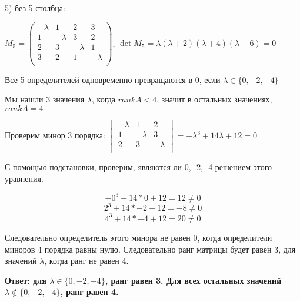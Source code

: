 \documentclass[a4paper,12pt]{article}
\begin{document}
\begin{enumerate}
5) без 5 столбца:

$M_5= \begin{pmatrix}
{-\lambda}&{1}&{2}&{3}\\
{1}&{-\lambda}&{3}&{2}\\
{2}&{3}&{-\lambda}&{1}\\
{3}&{2}&{1}&{-\lambda}\\
\end{pmatrix}$, $\det M_5 = \lambda(\lambda+2)(\lambda+4)(\lambda-6)=0$

Все 5 определителей одновременно превращаются в 0, если $\lambda \in \{ 0,-2,-4\} $

Мы нашли 3 значения $\lambda$, когда $rank A < 4$, значит в остальных значениях, $rank A = 4$

Проверим минор 3 порядка:
$\begin{vmatrix}
{-\lambda}&{1}&{2}\\
{1}&{-\lambda}&{3}\\
{2}&{3}&{-\lambda}\\
\end{vmatrix}=-\lambda^3+14\lambda+12=0$

С помощью подстановки, проверим, являются ли 0, -2, -4 решением этого уравнения.

$$-0^3+14*0+12=12\neq0$$
$$2^3+14*-2+12=-8\neq0$$
$$4^3+14*-4+12=20\neq0$$

Следовательно определитель этого минора не равен 0, когда определители миноров 4 порядка равны нулю. Следовательно ранг матрицы будет равен 3, для значений $\lambda$, когда ранг не равен 4.


\textbf{Ответ: для $\lambda \in \{ 0,-2,-4\}$, ранг равен 3. Для всех остальных значений $\lambda \notin \{ 0,-2,-4\}$, ранг равен 4.}
\end{enumerate}
\end{document}
